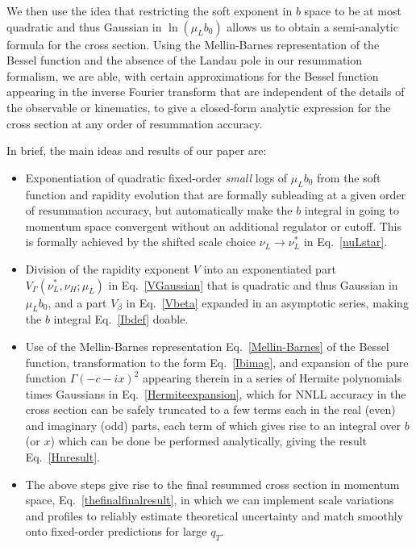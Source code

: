 \documentclass[a4,letterpaper,11pt]{article}
\newcommand{\eq}[1]{Eq.~\eqref{#1}}
\begin{document}
We then use the idea that restricting the soft exponent in $b$ space to be at most quadratic and thus Gaussian in $\ln (\mu_L b_0)$ allows us to obtain a semi-analytic formula for the cross section.
Using the Mellin-Barnes representation of the Bessel function and the absence of the Landau pole in our resummation formalism, we are able, with certain approximations for the Bessel function appearing in the inverse Fourier transform that are independent of the details of the observable or kinematics, to give a closed-form analytic expression for the cross section at any order of resummation accuracy.

In brief, the main ideas and results of our paper are:
\begin{itemize}
\item Exponentiation of quadratic fixed-order \emph{small} logs of $\mu_L b_0$ from the soft function and rapidity evolution that are formally subleading at a given order of resummation accuracy, but automatically make the $b$ integral in going to momentum space convergent without an additional regulator or cutoff. This is formally achieved by the shifted scale choice $\nu_L \to \nu_L^*$ in \eq{nuLstar}.

\item Division of the rapidity exponent $V$ into an exponentiated part $V_\Gamma(\nu_L^*,\nu_H;\mu_L)$ in \eq{VGaussian} that is quadratic and thus Gaussian in $\mu_L b_0$, and a part $V_\beta$ in \eq{Vbeta} expanded in an asymptotic series, making the $b$ integral \eq{Ibdef} doable.

\item Use of the Mellin-Barnes representation \eq{Mellin-Barnes} of the Bessel function, transformation to the form \eq{Ibimag}, and expansion of the pure function $\Gamma(-c-ix)^2$ appearing therein in a series of Hermite polynomials times Gaussians in \eq{Hermiteexpansion}, which for NNLL accuracy in the cross section can be safely truncated to a few terms each in the real (even) and imaginary (odd) parts, each term of which gives rise to an integral over $b$ (or $x$) which can be done be performed analytically, giving the result \eq{Hnresult}.

\item The above steps give rise to the final resummed cross section in momentum space, \eq{thefinalfinalresult}, in which we can implement scale variations and profiles to reliably estimate theoretical uncertainty and match smoothly onto fixed-order predictions for large $q_T$.
\end{itemize}
\end{document}
